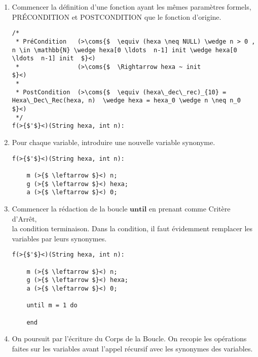 \documentclass[a4paper, 11pt, oneside]{article}
\newcommand{\coms}[1]{\textcolor{MidnightBlue}{#1}}
\begin{document}
		\begin{enumerate}
			\item Commencer la définition d'une fonction ayant les mêmes paramètres formels, 
					\\PRÉCONDITION et POSTCONDITION que le fonction d'origine.
					
			\begin{lstlisting}[caption={terminale\_1}]
/*
 * PréCondition   (>\coms{$  \equiv (hexa \neq NULL) \wedge n > 0 , n \in \mathbb{N} \wedge hexa[0 \ldots  n-1] init \wedge hexa[0 \ldots  n-1] init  $}<) 
 * 				  (>\coms{$  \Rightarrow hexa ~ init																								  $}<) 
 * 
 * PostCondition  (>\coms{$  \equiv (hexa\_dec\_rec)_{10} = Hexa\_Dec\_Rec(hexa, n)  \wedge hexa = hexa_0 \wedge n \neq n_0							  $}<)
 */
f(>{$'$}<)(String hexa, int n):

			\end{lstlisting}
			
\newpage
			\item Pour chaque variable, introduire une nouvelle variable synonyme.
		
			\begin{lstlisting}[caption={terminale\_2}]
f(>{$'$}<)(String hexa, int n):

	m (>{$ \leftarrow $}<) n;
	g (>{$ \leftarrow $}<) hexa;
	a (>{$ \leftarrow $}<) 0;

			\end{lstlisting}
			
			\item Commencer la rédaction de la boucle $\textbf{until}$ en prenant comme Critère d'Arrêt, 
					\\la condition terminaison. Dans la condition, il faut évidemment remplacer les variables par leurs synonymes.

			\begin{lstlisting}[caption={terminale\_3}]
f(>{$'$}<)(String hexa, int n):

	m (>{$ \leftarrow $}<) n;
	g (>{$ \leftarrow $}<) hexa;
	a (>{$ \leftarrow $}<) 0;
	
	until m = 1 do

	end
			\end{lstlisting}
			
			\item On poursuit par l'écriture du Corps de la Boucle. On recopie les opérations faites sur les variables avant l'appel récursif 
					avec les synonymes des variables.
					

\end{enumerate}
\end{document}
